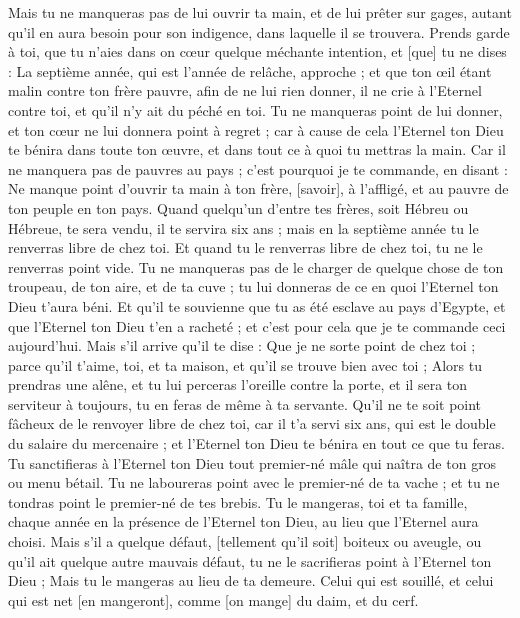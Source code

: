 \begin{multicols}{2}
Mais tu ne manqueras pas de lui ouvrir ta main, et de lui prêter sur gages, autant qu'il en aura besoin pour son indigence, dans laquelle il se trouvera.
Prends garde à toi, que tu n'aies dans on cœur quelque méchante intention, et [que] tu ne dises : La septième année, qui est l'année de relâche, approche ; et que ton œil étant malin contre ton frère pauvre, afin de ne lui rien donner, il ne crie à l'Eternel contre toi, et qu'il n'y ait du péché en toi.
Tu ne manqueras point de lui donner, et ton cœur ne lui donnera point à regret ; car à cause de cela l'Eternel ton Dieu te bénira dans toute ton œuvre, et dans tout ce à quoi tu mettras la main.
Car il ne manquera pas de pauvres au pays ; c'est pourquoi je te commande, en disant : Ne manque point d'ouvrir ta main à ton frère, [savoir], à l'affligé, et au pauvre de ton peuple en ton pays.
Quand quelqu'un d'entre tes frères, soit Hébreu ou Hébreue, te sera vendu, il te servira six ans ; mais en la septième année tu le renverras libre de chez toi.
Et quand tu le renverras libre de chez toi, tu ne le renverras point vide.
Tu ne manqueras pas de le charger de quelque chose de ton troupeau, de ton aire, et de ta cuve ; tu lui donneras de ce en quoi l'Eternel ton Dieu t'aura béni.
Et qu'il te souvienne que tu as été esclave au pays d'Egypte, et que l'Eternel ton Dieu t'en a racheté ; et c'est pour cela que je te commande ceci aujourd'hui.
Mais s'il arrive qu'il te dise : Que je ne sorte point de chez toi ; parce qu'il t'aime, toi, et ta maison, et qu'il se trouve bien avec toi ;
Alors tu prendras une alêne, et tu lui perceras l'oreille contre la porte, et il sera ton serviteur à toujours, tu en feras de même à ta servante.
Qu'il ne te soit point fâcheux de le renvoyer libre de chez toi, car il t'a servi six ans, qui est le double du salaire du mercenaire ; et l'Eternel ton Dieu te bénira en tout ce que tu feras.
Tu sanctifieras à l'Eternel ton Dieu tout premier-né mâle qui naîtra de ton gros ou menu bétail. Tu ne laboureras point avec le premier-né de ta vache ; et tu ne tondras point le premier-né de tes brebis.
Tu le mangeras, toi et ta famille, chaque année en la présence de l'Eternel ton Dieu, au lieu que l'Eternel aura choisi.
Mais s'il a quelque défaut, [tellement qu'il soit] boiteux ou aveugle, ou qu'il ait quelque autre mauvais défaut, tu ne le sacrifieras point à l'Eternel ton Dieu ;
Mais tu le mangeras au lieu de ta demeure. Celui qui est souillé, et celui qui est net [en mangeront], comme [on mange] du daim, et du cerf.

\end{multicols}
